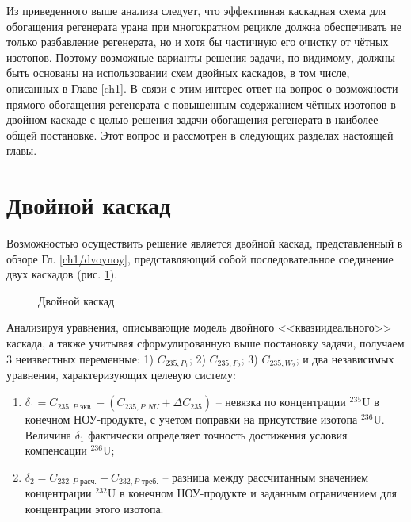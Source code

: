 Из приведенного выше анализа следует, что эффективная каскадная схема для обогащения регенерата урана при многократном рецикле должна обеспечивать не только разбавление регенерата, но и хотя бы частичную его очистку от чётных изотопов. Поэтому возможные варианты решения задачи, по-видимому, должны быть основаны на использовании схем двойных каскадов, в том числе, описанных в Главе \ref{ch1}. В связи с этим интерес ответ на вопрос о возможности прямого обогащения регенерата с повышенным содержанием чётных изотопов в двойном каскаде с целью решения задачи обогащения регенерата в наиболее общей постановке. Этот вопрос и рассмотрен в следующих разделах настоящей главы.



\section{Двойной каскад}\label{sec:ch2/dvoynoy}

Возможностью осуществить решение является двойной каскад, представленный в обзоре Гл. \ref{ch1/dvoynoy}, представляющий собой последовательное соединение двух каскадов (рис. \ref{fig:double_ru}). 

\begin{figure}[ht]
  \caption{Двойной каскад}\label{fig:double_ru}
\end{figure}

Анализируя уравнения, описывающие модель двойного <<квазиидеального>> каскада, а также учитывая сформулированную выше постановку задачи, получаем 3 неизвестных переменные: 1) $C_{235, P_1}$; 2) $C_{235, P_2}$; 3) $C_{235, W_2}$; и два независимых уравнения, характеризующих целевую систему:

\begin{enumerate}
    \item $\delta_{1}=C_{235,P\textit{ экв.}}-(C_{235,P\textit{ NU}}+\Delta C_{235})$ -- невязка по концентрации $^{235}$U в конечном НОУ-продукте, с учетом поправки на присутствие изотопа $^{236}$U. Величина $\delta_{1}$ фактически определяет точность достижения условия компенсации $^{236}$U;
    \item $\delta_{2}=C_{232,P\textit{ расч.}}-C_{232,P\textit{ треб.}}$ -- разница между рассчитанным значением концентрации $^{232}$U в конечном НОУ-продукте и заданным ограничением для концентрации этого изотопа.
\end{enumerate}

